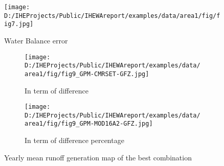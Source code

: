 \documentclass[oneside,openany]{article}%
\begin{document}
\begin{figure}[H]%
\centering%
\texttt{[image: D:/IHEProjects/Public/IHEWAreport/examples/data/area1/fig/fig7.jpg]}%
\caption{Water Balance error}%
\label{figure:fig16}%
\end{figure}

%


\begin{figure}[H]%
\begin{subfigure}[c]{0.5\textwidth}%
\texttt{[image: D:/IHEProjects/Public/IHEWAreport/examples/data/area1/fig/fig9\_GPM-CMRSET-GFZ.jpg]}%
\caption{In term of difference}%
\end{subfigure}%
\begin{subfigure}[c]{0.5\textwidth}%
\texttt{[image: D:/IHEProjects/Public/IHEWAreport/examples/data/area1/fig/fig9\_GPM-MOD16A2-GFZ.jpg]}%
\caption{In term of difference percentage}%
\end{subfigure}%
\caption{Yearly mean runoff generation map of the best combination}%
\label{figure:fig17}%
\end{figure}

%
\end{document}

